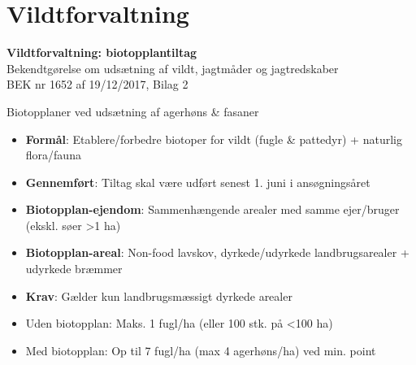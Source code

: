 \section{Vildtforvaltning}

\begin{frame}
  \vspace{3em}
  \begin{center}
    {\LARGE \textbf{Vildtforvaltning: biotopplantiltag}
    }
    \\
    \vspace{1em}
    Bekendtgørelse om udsætning af vildt, jagtmåder og jagtredskaber
    \\
    \vspace{1em}
    BEK nr 1652 af 19/12/2017, Bilag 2
  \end{center}
\end{frame}

\begin{frame}{Biotopplaner ved udsætning af agerhøns \& fasaner}
  \begin{itemize}
    \item \textbf{Formål}: Etablere/forbedre biotoper for vildt (fugle \& pattedyr) + naturlig flora/fauna
    \item \textbf{Gennemført}: Tiltag skal være udført senest 1. juni i ansøgningsåret
    \item \textbf{Biotopplan-ejendom}: Sammenhængende arealer med samme ejer/bruger (ekskl. søer >1 ha)
    \item \textbf{Biotopplan-areal}: Non-food lavskov, dyrkede/udyrkede landbrugsarealer + udyrkede bræmmer
    \item \textbf{Krav}: Gælder kun landbrugsmæssigt dyrkede arealer
    \item Uden biotopplan: Maks. 1 fugl/ha (eller 100 stk. på <100 ha)
    \item Med biotopplan: Op til 7 fugl/ha (max 4 agerhøns/ha) ved min. point
  \end{itemize}
\end{frame}

